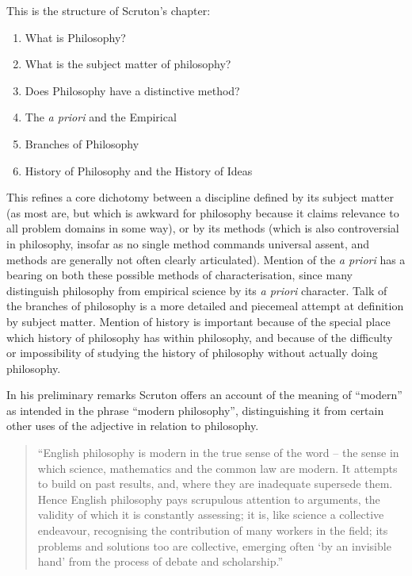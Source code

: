 \documentclass[10pt,titlepage]{article}
\begin{document}
This is the structure of Scruton's chapter:

\begin{enumerate}
\item What is Philosophy?
\item What is the subject matter of philosophy?
\item Does Philosophy have a distinctive method?
\item The {\it a priori} and the Empirical
\item Branches of Philosophy
\item History of Philosophy and the History of Ideas
\end{enumerate}

This refines a core dichotomy between a discipline defined by its subject matter (as most are, but which is awkward for philosophy because it claims relevance to all problem domains in some way), or by its methods (which is also controversial in philosophy, insofar as no single method commands universal assent, and methods are generally not often clearly articulated).
Mention of the {\it a priori} has a bearing on both these possible methods of characterisation, since many distinguish philosophy from empirical science by its {\it a priori} character.
Talk of the branches of philosophy is a more detailed and piecemeal attempt at definition by subject matter.
Mention of history is important because of the special place which history of philosophy has within philosophy, and because of the difficulty or impossibility of studying the history of philosophy without actually doing philosophy.

In his preliminary remarks Scruton offers an account of the meaning of ``modern'' as intended in the phrase ``modern philosophy'', distinguishing it from certain other uses of the adjective in relation to philosophy.

\begin{quote}
  ``English philosophy is modern in the true sense of the word -- the sense in which science, mathematics and the common law are modern.
  It attempts to build on past results, and, where they are inadequate supersede them.
  Hence English philosophy pays scrupulous attention to arguments, the validity of which it is constantly assessing; it is, like science a collective endeavour, recognising the contribution of many workers in the field; its problems and solutions too are collective, emerging often `by an invisible hand' from the process of debate and scholarship.''
\end{quote}
\end{document}
